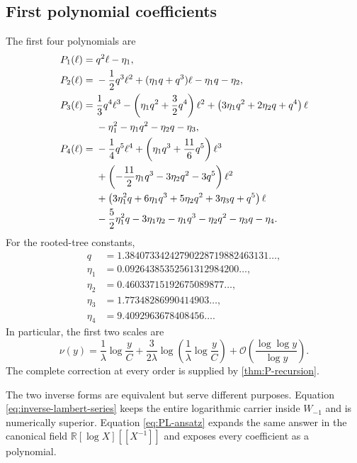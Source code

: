 \documentclass[11pt,oneside]{article}
\numberwithin{equation}{section}
\theoremstyle{plain}
\theoremstyle{definition}
\theoremstyle{remark}
\newcommand{\Ord}{\mathcal O}
\newcommand{\R}{\mathbb R}
\begin{document}
\subsection{First polynomial coefficients}

The first four polynomials are
\begin{align}
 P_1(\ell)={}&q^2\ell-\eta_1,\label{eq:P1}\\
 P_2(\ell)={}&-\frac12q^3\ell^2
 +(\eta_1q+q^3)\ell-\eta_1q-\eta_2,
 \label{eq:P2}\\
 P_3(\ell)={}&\frac13q^4\ell^3
 -\left(\eta_1q^2+\frac32q^4\right)\ell^2
 +\left(3\eta_1q^2+2\eta_2q+q^4\right)\ell
 \notag\\
 &-\eta_1^2-\eta_1q^2-\eta_2q-\eta_3,
 \label{eq:P3}\\
 P_4(\ell)={}&-\frac14q^5\ell^4
 +\left(\eta_1q^3+\frac{11}{6}q^5\right)\ell^3
 \notag\\
 &+\left(-\frac{11}{2}\eta_1q^3-3\eta_2q^2-3q^5\right)\ell^2
 \notag\\
 &+\left(3\eta_1^2q+6\eta_1q^3+5\eta_2q^2+3\eta_3q+q^5\right)\ell
 \notag\\
 &-\frac52\eta_1^2q-3\eta_1\eta_2-\eta_1q^3
 -\eta_2q^2-\eta_3q-\eta_4.
 \label{eq:P4}
\end{align}
For the rooted-tree constants,
\begin{align*}
 q&=1.38407334242790228719882463131\ldots,\\
 \eta_1&=0.09264385352561312984200\ldots,\\
 \eta_2&=0.46033715192675089877\ldots,\\
 \eta_3&=1.77348286990414903\ldots,\\
 \eta_4&=9.4092963678408456\ldots.
\end{align*}
In particular, the first two scales are
\begin{equation}\label{eq:inverse-leading-simple}
 \boxed{
 \nu(y)=\frac1\lambda\log\frac yC
 +\frac{3}{2\lambda}\log\!\left(
 \frac1\lambda\log\frac yC\right)
 +\Ord\!\left(\frac{\log\log y}{\log y}\right).}
\end{equation}
The complete correction at every order is supplied by
\cref{thm:P-recursion}.

\begin{checkpointbox}
The two inverse forms are equivalent but serve different purposes.
Equation \eqref{eq:inverse-lambert-series} keeps the entire logarithmic
carrier inside $W_{-1}$ and is numerically superior.  Equation
\eqref{eq:PL-ansatz} expands the same answer in the canonical field
$\R[\log X][[X^{-1}]]$ and exposes every coefficient as a polynomial.
\end{checkpointbox}
\end{document}
